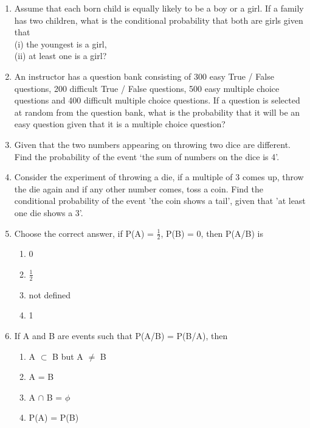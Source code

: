 \begin{enumerate}[label=\arabic*.,ref=\thesubsection.\theenumi]
\item  Assume that each born child is equally likely to be a boy or a girl. If a family has two children, what is the conditional probability that both are girls given that\\
(i) the youngest is a girl,\\ 
(ii) at least one is a girl?\\
\solution


\item  An instructor has a question bank consisting of 300 easy True / False questions,
200 difficult True / False questions, 500 easy multiple choice questions and 400 difficult multiple choice questions. If a question is selected at random from the question bank, what is the probability that it will be an easy question given that it is a multiple choice question?\\
\solution


\item  Given that the two numbers appearing on throwing two dice are different. Find the probability of the event `the sum of numbers on the dice is 4'.\\
\solution


\item Consider the experiment of throwing a die, if a multiple of 3 comes up, throw the die again and if any other number comes, toss a coin. Find the conditional probability of the event 'the coin shows a tail', given that 'at least one die shows a 3'.\\
\solution


\item Choose the correct answer, if P(A) = $\frac{1}{2}$, P(B) = 0, then P(A/B) is
\begin{enumerate}
\item 0
\item $\frac{1}{2}$
\item not defined
\item 1
\end{enumerate}

\item If A and B are events such that P(A/B) = P(B/A), then
\begin{enumerate}
\item A $\subset$ B but A $\neq$ B
\item A = B
\item A $\cap$ B = $\phi$
\item P(A) = P(B)
\end{enumerate}


\end{enumerate}
